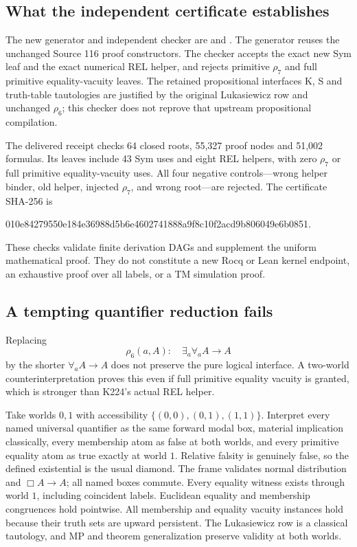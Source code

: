 \subsection{What the independent certificate establishes}

The new generator and independent checker are
 and
.  The generator reuses the unchanged
Source 116 proof constructors.  The checker accepts the exact new Sym
leaf and the exact numerical REL helper, and rejects primitive $\rho_7$
and full primitive equality-vacuity leaves.  The retained propositional
interfaces K, S and truth-table tautologies are justified by the original
Lukasiewicz row and unchanged $\rho_6$; this checker does not reprove that
upstream propositional compilation.

The delivered receipt checks 64 closed roots, 55,327 proof nodes and
51,002 formulas.  Its leaves include 43 Sym uses and eight REL helpers,
with zero $\rho_7$ or full primitive equality-vacuity uses.  All four
negative controls---wrong helper binder, old helper, injected $\rho_7$,
and wrong root---are rejected.  The certificate SHA-256 is
\begin{center}\ttfamily\small
010e84279550e184e36988d5b6e4602741888a9f8c10f2acd9b806049e6b0851.
\end{center}
These checks validate finite derivation DAGs and supplement the uniform
mathematical proof.  They do not constitute a new Rocq or Lean kernel
endpoint, an exhaustive proof over all labels, or a TM simulation proof.

\subsection{A tempting quantifier reduction fails}

Replacing
\[
 \rho_6(a,A):\quad \exists_a\forall_a A\to A
\]
by the shorter $\forall_a A\to A$ does not preserve the pure logical
interface.  A two-world counterinterpretation proves this even if full
primitive equality vacuity is granted, which is stronger than K224's
actual REL helper.

Take worlds $0,1$ with accessibility
$\{(0,0),(0,1),(1,1)\}$.  Interpret every named universal quantifier as
the same forward modal box, material implication classically, every
membership atom as false at both worlds, and every primitive equality
atom as true exactly at world $1$.  Relative falsity is genuinely false,
so the defined existential is the usual diamond.  The frame validates
normal distribution and $\Box A\to A$; all named boxes commute.
Every equality witness exists through world $1$, including coincident
labels.  Euclidean equality and membership congruences hold pointwise.
All membership and equality vacuity instances hold because their truth
sets are upward persistent.  The Lukasiewicz row is a classical tautology,
and MP and theorem generalization preserve validity at both worlds.

